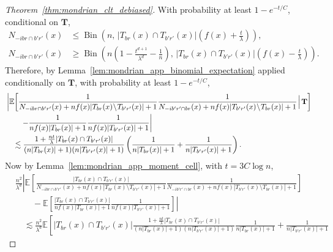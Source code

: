\documentclass[11pt,lof]{puthesis}
\newcommand{\E}{\ensuremath{\mathbb{E}}}
\newcommand{\bT}{\ensuremath{\mathbf{T}}}
\DeclareMathOperator{\Bin}{Bin}
\theoremstyle{break}
\theoremstyle{proof}
\newtheorem{proof}{Proof}
\begin{document}
\begin{proof}[Theorem~\ref{thm:mondrian_clt_debiased}]
  With probability at least $1 - e^{-t/C}$, conditional on $\bT$,
  \begin{align*}
    N_{-i b r \cap b' r'}(x)
    &\leq \Bin\left(
      n, \,
      |T_{b r}(x) \cap T_{b' r'}(x)|
      \left( f(x) + \frac{t}{\lambda} \right)
    \right), \\
    N_{-i b r \cap b' r'}(x)
    &\geq
    \Bin\left(
      n
      \left( 1 - \frac{t^{d+1}}{\lambda^d}
      - \frac{1}{n} \right), \,
      |T_{b r}(x) \cap T_{b' r'}(x)|
      \left( f(x) - \frac{t}{\lambda} \right)
    \right).
  \end{align*}
  Therefore, by Lemma~\ref{lem:mondrian_app_binomial_expectation}
  applied conditionally on $\bT$,
  with probability at least $1 - e^{-t/C}$,
  \begin{align*}
    &
    \left|
    \E \! \left[
      \frac{1}
      {N_{-i b r \cap b' r'}(x)
      + n f(x) |T_{b r}(x) \!\setminus\! T_{b' r'}(x)|+1}
      \frac{1}
      {N_{-i b' r' \cap b r}(x)
      + n f(x) |T_{b' r'}(x) \!\setminus\! T_{b r}(x)|+1}
      \! \Bigm| \! \bT
    \right]
    \right.
    \\
    &\left.
    \qquad-
    \frac{1}
    {n f(x) |T_{b r}(x)|+1}
    \frac{1}
    {n f(x) |T_{b' r'}(x)|+1}
    \right| \\
    &\quad\lesssim
    \frac{1 + \frac{n t}{\lambda} |T_{b r}(x) \cap T_{b' r'}(x)|}
    {(n |T_{b r}(x)| + 1)(n |T_{b' r'}(x)| + 1)}
    \left(
      \frac{1}{n |T_{b r}(x)| + 1}
      + \frac{1}{n |T_{b' r'}(x)| + 1}
    \right).
  \end{align*}
  Now by Lemma~\ref{lem:mondrian_app_moment_cell},
  with $t = 3 C \log n$,
  \begin{align*}
    &\frac{n^2}{\lambda^d}
    \left|
    \E \! \left[
      \frac{|T_{b r}(x) \cap T_{b' r'}(x)|}
      {N_{-i b r \cap b' r'}(x)
      + n f(x) |T_{b r}(x) \!\setminus\! T_{b' r'}(x)|+1}
      \frac{1}
      {N_{-i b' r' \cap b r}(x)
      + n f(x) |T_{b' r'}(x) \!\setminus\! T_{b r}(x)|+1}
    \right]
    \right. \\
    &\left.
    \qquad-
    \E \left[
      \frac{|T_{b r}(x) \cap T_{b' r'}(x)|}
      {n f(x) |T_{b r}(x)|+1}
      \frac{1}
      {n f(x) |T_{b' r'}(x)|+1}
    \right]
    \right| \\
    &\quad\lesssim
    \frac{n^2}{\lambda^d}
    \E \left[
      |T_{b r}(x) \cap T_{b' r'}(x)|
      \frac{1 + \frac{n t}{\lambda} |T_{b r}(x) \cap T_{b' r'}(x)|}
      {(n |T_{b r}(x)| + 1)(n |T_{b' r'}(x)| + 1)}
      \frac{1}{n |T_{b r}(x)| + 1}
      + \frac{1}{n |T_{b' r'}(x)| + 1}

\end{align*}
\end{proof}
\end{document}
